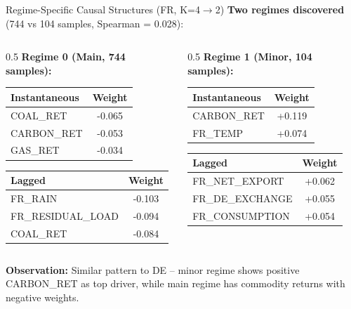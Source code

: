 \documentclass[aspectratio=169]{beamer}
\begin{document}
\begin{frame}{Regime-Specific Causal Structures (FR, K=4$\rightarrow$2)}
\textbf{Two regimes discovered} (744 vs 104 samples, Spearman = 0.028):

\vspace{0.2cm}
\begin{columns}
\begin{column}{0.5\textwidth}
\textbf{Regime 0 (Main, 744 samples):}
\begin{table}
\scriptsize
\begin{tabular}{l|c}
\toprule
\textbf{Instantaneous} & \textbf{Weight} \\
\midrule
COAL\_RET & -0.065 \\
CARBON\_RET & -0.053 \\
GAS\_RET & -0.034 \\
\bottomrule
\end{tabular}
\end{table}
\begin{table}
\scriptsize
\begin{tabular}{l|c}
\toprule
\textbf{Lagged} & \textbf{Weight} \\
\midrule
FR\_RAIN & -0.103 \\
FR\_RESIDUAL\_LOAD & -0.094 \\
COAL\_RET & -0.084 \\
\bottomrule
\end{tabular}
\end{table}
\end{column}

\begin{column}{0.5\textwidth}
\textbf{Regime 1 (Minor, 104 samples):}
\begin{table}
\scriptsize
\begin{tabular}{l|c}
\toprule
\textbf{Instantaneous} & \textbf{Weight} \\
\midrule
\textcolor{reprogreen}{CARBON\_RET} & +0.119 \\
FR\_TEMP & +0.074 \\
\bottomrule
\end{tabular}
\end{table}
\begin{table}
\scriptsize
\begin{tabular}{l|c}
\toprule
\textbf{Lagged} & \textbf{Weight} \\
\midrule
FR\_NET\_EXPORT & +0.062 \\
FR\_DE\_EXCHANGE & +0.055 \\
FR\_CONSUMPTION & +0.054 \\
\bottomrule
\end{tabular}
\end{table}
\end{column}
\end{columns}

\vspace{0.2cm}
\textbf{Observation:} Similar pattern to DE -- minor regime shows \textcolor{reprogreen}{positive CARBON\_RET} as top driver, while main regime has commodity returns with \textcolor{warnred}{negative} weights.
\end{frame}
\end{document}
